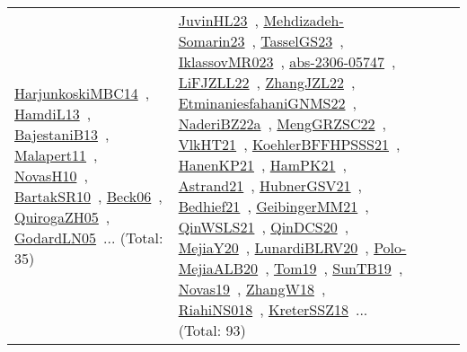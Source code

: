 {\begin{longtable}{lp{3cm}>{\raggedright\arraybackslash}p{6cm}>{\raggedright\arraybackslash}p{6cm}>{\raggedright\arraybackslash}p{8cm}}
\href{../works/HarjunkoskiMBC14.pdf}{HarjunkoskiMBC14}~\cite{HarjunkoskiMBC14}, \href{../works/HamdiL13.pdf}{HamdiL13}~\cite{HamdiL13}, \href{../works/BajestaniB13.pdf}{BajestaniB13}~\cite{BajestaniB13}, \href{../works/Malapert11.pdf}{Malapert11}~\cite{Malapert11}, \href{../works/NovasH10.pdf}{NovasH10}~\cite{NovasH10}, \href{../works/BartakSR10.pdf}{BartakSR10}~\cite{BartakSR10}, \href{../works/Beck06.pdf}{Beck06}~\cite{Beck06}, \href{../works/QuirogaZH05.pdf}{QuirogaZH05}~\cite{QuirogaZH05}, \href{../works/GodardLN05.pdf}{GodardLN05}~\cite{GodardLN05}... (Total: 35) & \href{../works/JuvinHL23.pdf}{JuvinHL23}~\cite{JuvinHL23}, \href{../works/Mehdizadeh-Somarin23.pdf}{Mehdizadeh-Somarin23}~\cite{Mehdizadeh-Somarin23}, \href{../works/TasselGS23.pdf}{TasselGS23}~\cite{TasselGS23}, \href{../works/IklassovMR023.pdf}{IklassovMR023}~\cite{IklassovMR023}, \href{../works/abs-2306-05747.pdf}{abs-2306-05747}~\cite{abs-2306-05747}, \href{../works/LiFJZLL22.pdf}{LiFJZLL22}~\cite{LiFJZLL22}, \href{../works/ZhangJZL22.pdf}{ZhangJZL22}~\cite{ZhangJZL22}, \href{../works/EtminaniesfahaniGNMS22.pdf}{EtminaniesfahaniGNMS22}~\cite{EtminaniesfahaniGNMS22}, \href{../works/NaderiBZ22a.pdf}{NaderiBZ22a}~\cite{NaderiBZ22a}, \href{../works/MengGRZSC22.pdf}{MengGRZSC22}~\cite{MengGRZSC22}, \href{../works/VlkHT21.pdf}{VlkHT21}~\cite{VlkHT21}, \href{../works/KoehlerBFFHPSSS21.pdf}{KoehlerBFFHPSSS21}~\cite{KoehlerBFFHPSSS21}, \href{../works/HanenKP21.pdf}{HanenKP21}~\cite{HanenKP21}, \href{../works/HamPK21.pdf}{HamPK21}~\cite{HamPK21}, \href{../works/Astrand21.pdf}{Astrand21}~\cite{Astrand21}, \href{../works/HubnerGSV21.pdf}{HubnerGSV21}~\cite{HubnerGSV21}, \href{../works/Bedhief21.pdf}{Bedhief21}~\cite{Bedhief21}, \href{../works/GeibingerMM21.pdf}{GeibingerMM21}~\cite{GeibingerMM21}, \href{../works/QinWSLS21.pdf}{QinWSLS21}~\cite{QinWSLS21}, \href{../works/QinDCS20.pdf}{QinDCS20}~\cite{QinDCS20}, \href{../works/MejiaY20.pdf}{MejiaY20}~\cite{MejiaY20}, \href{../works/LunardiBLRV20.pdf}{LunardiBLRV20}~\cite{LunardiBLRV20}, \href{../works/Polo-MejiaALB20.pdf}{Polo-MejiaALB20}~\cite{Polo-MejiaALB20}, \href{../works/Tom19.pdf}{Tom19}~\cite{Tom19}, \href{../works/SunTB19.pdf}{SunTB19}~\cite{SunTB19}, \href{../works/Novas19.pdf}{Novas19}~\cite{Novas19}, \href{../works/ZhangW18.pdf}{ZhangW18}~\cite{ZhangW18}, \href{../works/RiahiNS018.pdf}{RiahiNS018}~\cite{RiahiNS018}, \href{../works/KreterSSZ18.pdf}{KreterSSZ18}~\cite{KreterSSZ18}... (Total: 93)\\

\end{longtable}}

